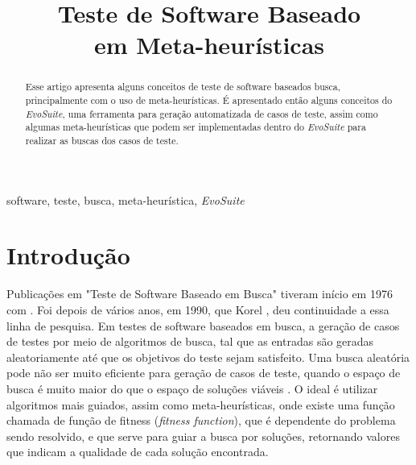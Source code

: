 \documentclass[conference]{IEEEtran}
\begin{document}
\title{Teste de Software Baseado  \\ em Meta-heurísticas
}

\author{
\and
{}
\and
{}
}

\maketitle

\begin{abstract}

Esse artigo apresenta alguns conceitos de teste de software baseados busca, principalmente com o uso de meta-heurísticas. É apresentado então alguns conceitos do \emph{EvoSuite}, uma ferramenta para geração automatizada de casos de teste, assim como algumas meta-heurísticas que podem ser implementadas dentro do \emph{EvoSuite} para realizar as buscas dos casos de teste.
\end{abstract}

\begin{IEEEkeywords}
software, teste, busca, meta-heurística, \emph{EvoSuite}
\end{IEEEkeywords}

\section{Introdução}

Publicações em "Teste de Software Baseado em Busca" tiveram início em 1976 com \cite{Miller:1976}. Foi depois de vários anos, em 1990, que Korel \cite{Korel:1990}, \cite{Korel:1992} deu continuidade a essa linha de pesquisa. Em testes de software baseados em busca, a geração de casos de testes por meio de algoritmos de busca, tal que as entradas são geradas aleatoriamente até que os objetivos do teste sejam satisfeito. Uma busca aleatória pode não ser muito eficiente para geração de casos de teste, quando o espaço de busca é muito maior do que o espaço de soluções viáveis \cite{McMinn:2011}. O ideal é utilizar algoritmos mais guiados, assim como meta-heurísticas, onde existe uma função chamada de função de fitness (\emph{fitness function}), que é dependente do problema sendo resolvido, e que serve para guiar a busca por soluções, retornando valores que indicam a qualidade de cada solução encontrada. 
\end{document}
